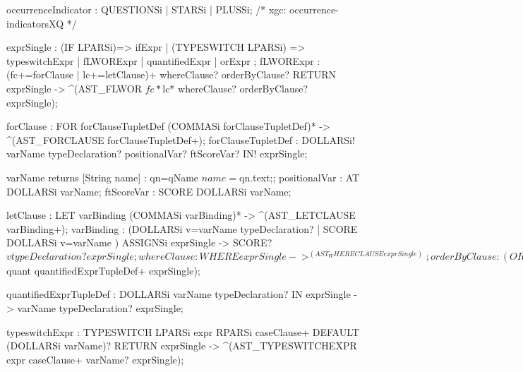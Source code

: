   occurrenceIndicator : QUESTIONSi | STARSi | PLUSSi; 
                        /* xgc: occurrence-indicatorsXQ */

exprSingle : (IF LPARSi)=> ifExpr
           | (TYPESWITCH LPARSi) => typeswitchExpr
           | fLWORExpr
           | quantifiedExpr
           | orExpr
           ;
  fLWORExpr : (fc+=forClause | lc+=letClause)+ 
              whereClause? orderByClause? RETURN exprSingle
             -> ^(AST_FLWOR $fc* $lc* 
                  whereClause? orderByClause? exprSingle);

    forClause : FOR forClauseTupletDef 
                (COMMASi forClauseTupletDef)*
                -> ^(AST_FORCLAUSE forClauseTupletDef+);
            forClauseTupletDef : DOLLARSi! varName typeDeclaration? 
                                 positionalVar? ftScoreVar? IN! exprSingle;

      varName returns [String name] : qn=qName {$name = $qn.text;};
      positionalVar : AT DOLLARSi varName;
      ftScoreVar : SCORE DOLLARSi varName;

    letClause : LET varBinding (COMMASi varBinding)*
               -> ^(AST_LETCLAUSE varBinding+);
    varBinding :
      (DOLLARSi v=varName typeDeclaration? | SCORE DOLLARSi v=varName )
            ASSIGNSi exprSingle
            -> SCORE? $v typeDeclaration? exprSingle;

    whereClause : WHERE exprSingle
                  -> ^(AST_WHERECLAUSE exprSingle);
    orderByClause : (ORDER BY | STABLE ORDER BY) orderSpecList
                    -> ^(AST_ORDERBYCLAUSE STABLE? orderSpecList);
      orderSpecList : orderSpec (COMMASi orderSpec)*
                      -> orderSpec+;
        orderSpec : exprSingle orderModifier;
          orderModifier : (ASCENDING | DESCENDING)? 
                          (EMPTY (GREATEST | LEAST))? 
                          (COLLATION uriLiteral)?;
  quantifiedExpr : (quant=SOME | quant=EVERY) quantifiedExprTupleDef
                   (COMMASi quantifiedExprTupleDef)* SATISFIES exprSingle
          -> ^(AST_QUANTIFIEDEXPR $quant quantifiedExprTupleDef+ exprSingle);

    quantifiedExprTupleDef : DOLLARSi varName typeDeclaration? IN exprSingle
                             -> varName typeDeclaration? exprSingle;

  typeswitchExpr : TYPESWITCH LPARSi expr RPARSi caseClause+ 
                   DEFAULT (DOLLARSi varName)? RETURN exprSingle
          -> ^(AST_TYPESWITCHEXPR expr caseClause+ varName? exprSingle);

